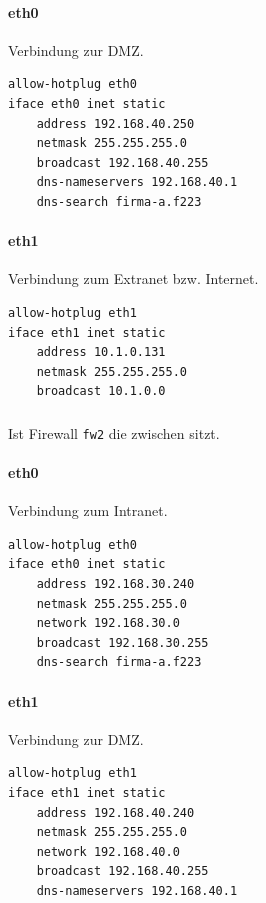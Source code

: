 \paragraph{eth0} Verbindung zur DMZ.

\begin{lstlisting}[label=lst:dmz:eth0,caption={Netzwerkadapter eth0 Konfiguration.}]
allow-hotplug eth0
iface eth0 inet static
    address 192.168.40.250
    netmask 255.255.255.0
    broadcast 192.168.40.255
    dns-nameservers 192.168.40.1
    dns-search firma-a.f223
\end{lstlisting}

\paragraph{eth1} Verbindung zum Extranet bzw. Internet.

\begin{lstlisting}[label=lst:extranet:eth1,caption={Netzwerkadapter eth1 Konfiguration.}]
allow-hotplug eth1
iface eth1 inet static
    address 10.1.0.131
    netmask 255.255.255.0
    broadcast 10.1.0.0
\end{lstlisting}


\subsubsection{\fwb}

Ist Firewall {\tt fw2} die zwischen \fwb sitzt.

\paragraph{eth0} Verbindung zum Intranet.

\begin{lstlisting}[label=lst:dmz:eth0,caption={Netzwerkadapter eth0 Konfiguration.}]
allow-hotplug eth0
iface eth0 inet static
    address 192.168.30.240
    netmask 255.255.255.0
    network 192.168.30.0
    broadcast 192.168.30.255
    dns-search firma-a.f223
\end{lstlisting}

\paragraph{eth1} Verbindung zur DMZ.

\begin{lstlisting}[label=lst:extranet:eth1,caption={Netzwerkadapter eth1 Konfiguration.}]
allow-hotplug eth1
iface eth1 inet static
    address 192.168.40.240
    netmask 255.255.255.0
    network 192.168.40.0
    broadcast 192.168.40.255
    dns-nameservers 192.168.40.1
\end{lstlisting}


